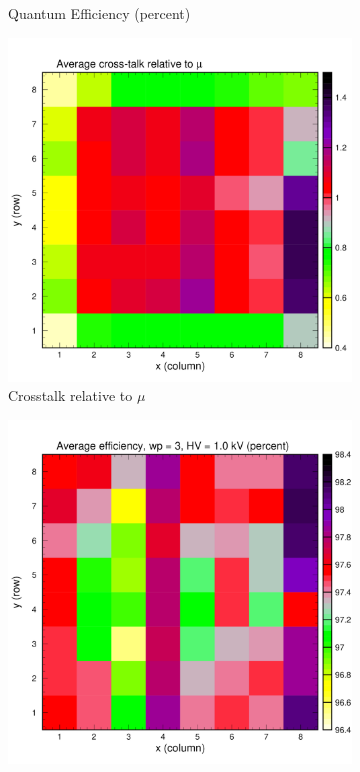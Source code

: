\begin{figure}[t!]
\begin{subfigure}[c]{0.48\linewidth}
		\caption{Quantum Efficiency (percent)}
		\vspace{0mm}
	\end{subfigure}%
	\vspace{3mm}
	\begin{subfigure}[c]{0.48\linewidth}
		\centering
		\includegraphics[width=\linewidth, trim={0mm 0mm 0mm 19mm},clip]{figures/pglobal_beta.pdf}
		\caption{Crosstalk relative to $\mu$}
		\vspace{0mm}
	\end{subfigure}%
	\begin{subfigure}[c]{0.48\linewidth}
		\centering
		\includegraphics[width=\linewidth, trim={0mm 0mm 0mm 19mm},clip]{figures/pglobal_eff2d.pdf}

\end{subfigure}
\end{figure}
